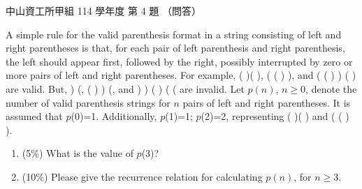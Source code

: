 \begin{pastexam}[label={px:nsysu-114-osds-04}]{中山資工所甲組 114 學年度 第 4 題}
（問答）

A simple rule for the valid parenthesis format in a string consisting of left and right parentheses is
that, for each pair of left parenthesis and right parenthesis, the left should appear first, followed by the
right, possibly interrupted by zero or more pairs of left and right parentheses. For example, ( )( ), ( ( ) ),
and ( ( ) ) ( ) are valid. But, ) (, ( ) ) (, and ) ) ( ) ( ( are invalid. Let $p(n)$, $n\ge 0$, denote the
number of valid parenthesis strings for $n$ pairs of left and right parentheses. It is assumed that
$p$(0)=1. Additionally, $p$(1)=1; $p$(2)=2, representing ( )( ) and ( ( ) ).
\begin{enumerate}[label=(\alph*)]
\item (5\%) What is the value of $p$(3)?
\item (10\%) Please give the recurrence relation for calculating $p(n)$, for $n\ge 3$.
\end{enumerate}
\end{pastexam}

